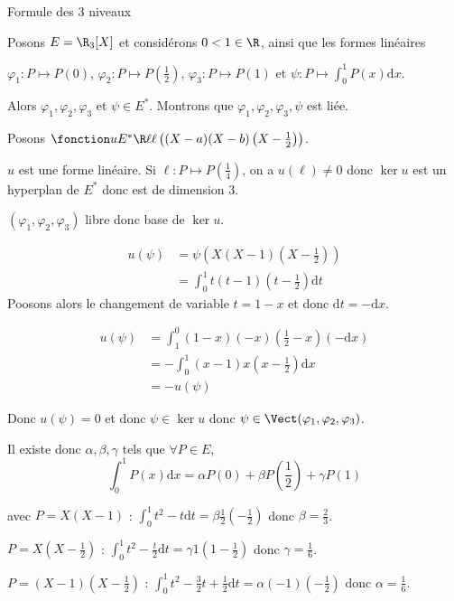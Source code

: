 \begin{exemple}
    Formule des 3 niveaux 

    Posons $E = \R_3[X]$ et considérons $0 < 1 \in \R$, ainsi que les formes linéaires 

    $\varphi_1 : P \mapsto P(0)$, $\varphi_2 : P \mapsto P\left( \frac{1}{2 } \right)$, $\varphi_3 : P \mapsto P(1)$
    et $\psi : P \mapsto \int_0^1 P(x) \mathrm d x$.

    Alors $\varphi_1, \varphi_2, \varphi_3$ et $\psi \in E^*$. Montrons que $\varphi_1, \varphi_2, \varphi_3, \psi$ est liée. 

    Posons $\fonction u {E^*} \R \ell {\ell\left( (X - a)(X - b) \left(X - \frac{1} 2 \right) \right)}$.

    $u$ est une forme linéaire. Si $\ell : P \mapsto P\left( \frac 1 4 \right)$, on a $u(\ell) \neq 0$
    donc $\ker u$ est un hyperplan de $E^*$ donc est de dimension $3$.

    $(\varphi_1, \varphi_2, \varphi_3)$ libre donc base de $\ker u$.

    \begin{align}
        u(\psi) & = \psi\left( X(X - 1) \left( X - \frac{1} 2 \right) \right) \\
        & = \int_0^1 t(t - 1) \left( t - \frac{1} 2 \right) \mathrm d t 
    \end{align}
    Poosons alors le changement de variable $t = 1 - x$ et donc $\mathrm d t = - \mathrm d x$.

    \begin{align}
        u(\psi) & = \int_1^0 (1 - x)(-x) \left( \frac 1 2 - x \right) (- \mathrm d x) \\
        & = - \int_0^1 (x - 1)x \left( x - \frac 1 2 \right) \mathrm d x \\
        & = - u(\psi) 
    \end{align}

    Donc $u(\psi) = 0$ et donc $\psi \in \ker u$ donc $\psi \in \Vect(\varphi_1, \varphi_2, \varphi_3)$.

    Il existe donc $\alpha, \beta, \gamma$ tels que $\forall P \in E$, 
    $$\int_0^1 P(x) \mathrm d x = \alpha P(0) + \beta P\left( \frac 1 2 \right) + \gamma P(1)$$

    avec $P = X(X - 1)$ : 
    $\int_0^1 t^2 - t \mathrm d t = \beta \frac 1 2 \left( - \frac 1 2 \right)$ donc $\beta = \frac 2 3$.

    $P = X\left( X - \frac 1 2 \right)$ : 
    $\int_0^1 t^2 - \frac t 2 \mathrm d t = \gamma 1 (1 - \frac 1 2 )$ donc $\gamma = \frac 1 6$.

    $P = (X - 1) \left( X - \frac 1 2 \right)$ : 
    $\int_0^1 t^2 - \frac 3 2 t + \frac 1 2 \mathrm d t = \alpha (-1)(- \frac 1 2 )$ donc $\alpha = \frac 1 6$.
\end{exemple}



